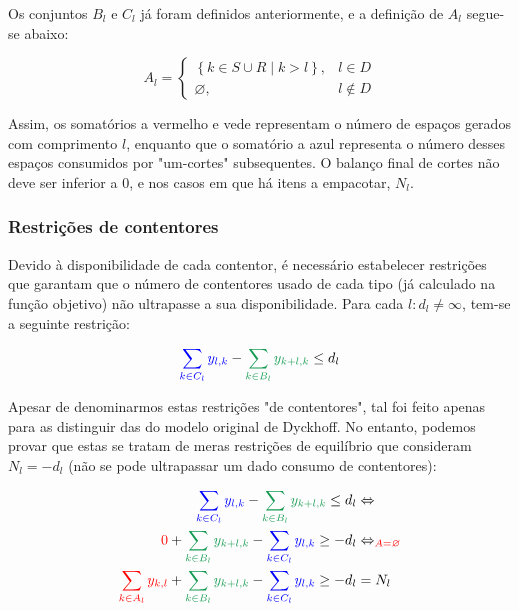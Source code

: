 \documentclass[12pt, a4paper, titlepage]{article}
\begin{document}
Os conjuntos $B_l$ e $C_l$ já foram definidos anteriormente, e a definição de $A_l$ segue-se abaixo:

\begin{equation}
    A_l =
    \begin{cases}
        \left \{ k \in S \cup R \mid k > l \right \}, & l \in D \\
        \varnothing, & l \not \in D
    \end{cases}
\end{equation}

Assim, os somatórios a {\color{red} vermelho} e {\color{ForestGreen} vede} representam o número de
espaços gerados com comprimento $l$, enquanto que o somatório a {\color{blue} azul} representa o
número desses espaços consumidos por "um-cortes"{} subsequentes. O balanço final de cortes não deve
ser inferior a $0$, e nos casos em que há itens a empacotar, $N_l$.

\subsubsection{Restrições de contentores}

Devido à disponibilidade de cada contentor, é necessário estabelecer restrições que garantam que o
número de contentores usado de cada tipo (já calculado na função objetivo) não ultrapasse a sua
disponibilidade. Para cada $l: d_l \not = \infty$, tem-se a seguinte restrição:

\begin{equation}
    {\color{blue} \sum_{k \in C_l} y_{l,k}} -
    {\color{ForestGreen} \sum_{k \in B_l} y_{k + l, k}} \leq d_l
    \label{eq:container-restriction}
\end{equation}

Apesar de denominarmos estas restrições "de contentores"{}, tal foi feito apenas para as distinguir
das do modelo original de Dyckhoff. No entanto, podemos provar que estas se tratam de meras
restrições de equilíbrio que consideram $N_l = -d_l$ (não se pode ultrapassar um dado consumo de
contentores):

\begin{equation}
    \begin{split}
        \nonumber
        {\color{blue} \sum_{k \in C_l} y_{l,k}} -
        {\color{ForestGreen} \sum_{k \in B_l} y_{k + l, k}} \leq d_l
        & \Leftrightarrow \\
        \nonumber
        {\color{red} 0} +
        {\color{ForestGreen} \sum_{k \in B_l} y_{k + l, k}} -
        {\color{blue} \sum_{k \in C_l} y_{l,k}} \geq - d_l
        & \Leftrightarrow_{\color{red} A = \varnothing} \\
        \nonumber
        {\color{red} \sum_{k \in A_l} y_{k, l}} +
        {\color{ForestGreen} \sum_{k \in B_l} y_{k + l, k}} -
        {\color{blue} \sum_{k \in C_l} y_{l,k}} \geq - d_l & = N_l
    \end{split}
\end{equation}
\end{document}

